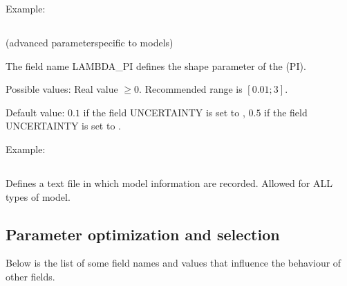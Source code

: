 \documentclass[letterpaper,10pt,english]{sphinxmanual}
\begin{document}
\begin{DUlineblock}{0em}
\item[] Example:
\item[] 
\end{DUlineblock}


\subsection{}
\label{\detokenize{SgteLib:lambda-pi}}\label{\detokenize{SgteLib:id26}}
\sphinxAtStartPar
(advanced parameterspecific to {\hyperref[\detokenize{SgteLib:ensemble-stat}]{}} models)

\begin{DUlineblock}{0em}
\item[] The field name LAMBDA\_PI defines the shape parameter of the  (PI).
\end{DUlineblock}

\begin{DUlineblock}{0em}
\item[] Possible values: Real value \(\geq 0\). Recommended range is \([0.01; 3]\).
\item[] Default value: \(0.1\) if the field UNCERTAINTY is set to , \(0.5\) if the field UNCERTAINTY is set to .
\end{DUlineblock}

\begin{DUlineblock}{0em}
\item[] Example:
\item[] 
\end{DUlineblock}


\subsection{}
\label{\detokenize{SgteLib:output}}\label{\detokenize{SgteLib:id27}}
\sphinxAtStartPar
Defines a text file in which model information are recorded. Allowed for ALL types of model.


\subsection{Parameter optimization and selection}
\label{\detokenize{SgteLib:parameter-optimization-and-selection}}
\sphinxAtStartPar
Below is the list of some field names and values that influence the behaviour of other fields.
\end{document}

